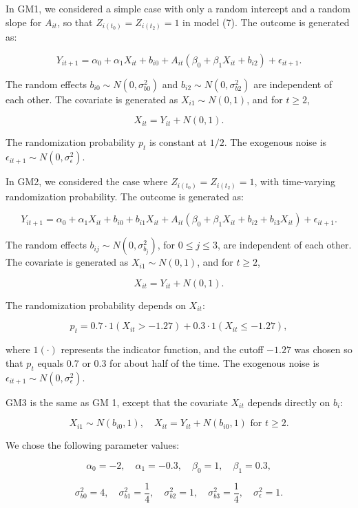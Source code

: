 \documentclass[
  12pt,
  a4paper,
]{article}
\begin{document}
In GM1, we considered a simple case with only a random intercept and a
random slope for \(A_{it}\), so that \(Z_{i(t_0)} = Z_{i(t_2)} = 1\) in
model (7). The outcome is generated as:

\[
Y_{it+1} = \alpha_0 + \alpha_1 X_{it} + b_{i0} + A_{it} (\beta_0 + \beta_1 X_{it} + b_{i2}) + \epsilon_{it+1}.
\]

The random effects \(b_{i0} \sim N(0, \sigma_{b0}^2)\) and
\(b_{i2} \sim N(0, \sigma_{b2}^2)\) are independent of each other. The
covariate is generated as \(X_{i1} \sim N(0, 1)\), and for \(t \geq 2\),

\[
X_{it} = Y_{it} + N(0, 1).
\]

The randomization probability \(p_t\) is constant at \(1/2\). The
exogenous noise is \(\epsilon_{it+1} \sim N(0, \sigma_\epsilon^2)\).

In GM2, we considered the case where \(Z_{i(t_0)} = Z_{i(t_2)} = 1\),
with time-varying randomization probability. The outcome is generated
as:

\[
Y_{it+1} = \alpha_0 + \alpha_1 X_{it} + b_{i0} + b_{i1} X_{it} + A_{it} (\beta_0 + \beta_1 X_{it} + b_{i2} + b_{i3} X_{it}) + \epsilon_{it+1}.
\]

The random effects \(b_{ij} \sim N(0, \sigma_{b_j}^2)\), for
\(0 \leq j \leq 3\), are independent of each other. The covariate is
generated as \(X_{i1} \sim N(0, 1)\), and for \(t \geq 2\),

\[
X_{it} = Y_{it} + N(0, 1).
\]

The randomization probability depends on \(X_{it}\):

\[
p_t = 0.7 \cdot 1(X_{it} > -1.27) + 0.3 \cdot 1(X_{it} \leq -1.27),
\]

where \(1(\cdot)\) represents the indicator function, and the cutoff
\(-1.27\) was chosen so that \(p_t\) equals 0.7 or 0.3 for about half of
the time. The exogenous noise is
\(\epsilon_{it+1} \sim N(0, \sigma_\epsilon^2)\).

GM3 is the same as GM 1, except that the covariate \(X_{it}\) depends
directly on \(b_i\):

\[
X_{i1} \sim N(b_{i0}, 1), \quad X_{it} = Y_{it} + N(b_{i0}, 1) \text{ for } t \geq 2.
\]

We chose the following parameter values:

\[
\alpha_0 = -2, \quad \alpha_1 = -0.3, \quad \beta_0 = 1, \quad \beta_1 = 0.3,
\]

\[
\sigma_{b0}^2 = 4, \quad \sigma_{b1}^2 = \frac{1}{4}, \quad \sigma_{b2}^2 = 1, \quad \sigma_{b3}^2 = \frac{1}{4}, \quad \sigma_\epsilon^2 = 1.
\]
\end{document}
